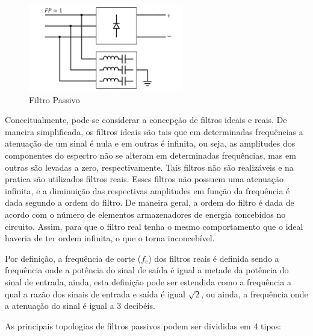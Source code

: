 \begin{figure}[!htbp]
	\centering
	\includegraphics[width=0.6\textwidth]{Cap2/Figuras/sch_filtro_passivo.png}
	\caption{Filtro Passivo}
	\label{fig:sch_filtro_passivo}
\end{figure}

Conceitualmente, pode-se considerar a concepção de filtros ideais e reais. De maneira simplificada, os filtros ideais são tais que em determinadas frequências a atenuação de um sinal é nula e em outras é infinita, ou seja, as amplitudes dos componentes do espectro não se alteram em determinadas frequências, mas em outras são levadas a zero, respectivamente. Tais filtros não são realizáveis e na pratica são utilizados filtros reais. Esses filtros não possuem uma atenuação infinita, e a diminuição das respectivas amplitudes em função da frequência é dada segundo a ordem do filtro. De maneira geral, a ordem do filtro é dada de acordo com o número de elementos armazenadores de energia concebidos no circuito. Assim, para que o filtro real tenha o mesmo comportamento que o ideal haveria de ter ordem infinita, o que o torna inconcebível. 

Por definição, a frequência de corte ($f_c$) dos filtros reais é definida sendo a frequência onde a potência do sinal de saída é igual a metade da potência do sinal de entrada, ainda, esta definição pode ser estendida como a frequência a qual a razão dos sinais de entrada e saída é igual $\sqrt{2}$, ou ainda, a frequência onde a atenuação do sinal é igual a 3 decibéis.

As principais topologias de filtros passivos podem ser divididas em 4 tipos:

